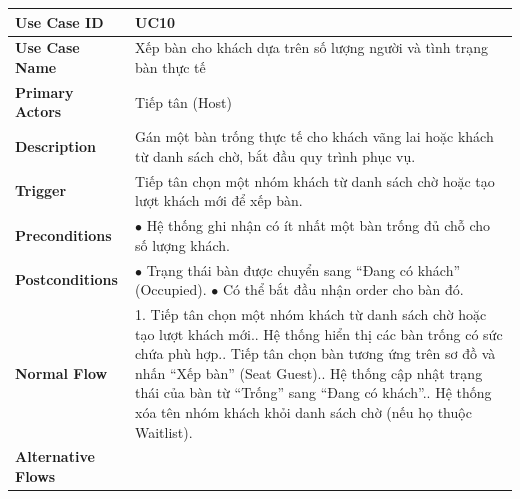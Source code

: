 \begin{longtable}{|p{3.5cm}|p{12.5cm}|}
\hline
\textbf{Use Case ID} & UC10 \\ \hline
\textbf{Use Case Name} & Xếp bàn cho khách dựa trên số lượng người và tình trạng bàn thực tế \\ \hline
\textbf{Primary Actors} & Tiếp tân (Host) \\ \hline
\textbf{Description} & Gán một bàn trống thực tế cho khách vãng lai hoặc khách từ danh sách chờ, bắt đầu quy trình phục vụ. \\ \hline
\textbf{Trigger} & Tiếp tân chọn một nhóm khách từ danh sách chờ hoặc tạo lượt khách mới để xếp bàn. \\ \hline
\textbf{Preconditions} & $\bullet$ Hệ thống ghi nhận có ít nhất một bàn trống đủ chỗ cho số lượng khách. \\ \hline
\textbf{Postconditions} &
$\bullet$ Trạng thái bàn được chuyển sang ``Đang có khách'' (Occupied).\newline
$\bullet$ Có thể bắt đầu nhận order cho bàn đó. \\ \hline
\textbf{Normal Flow} &
1. Tiếp tân chọn một nhóm khách từ danh sách chờ hoặc tạo lượt khách mới.\newline
2. Hệ thống hiển thị các bàn trống có sức chứa phù hợp.\newline
3. Tiếp tân chọn bàn tương ứng trên sơ đồ và nhấn ``Xếp bàn'' (Seat Guest).\newline
4. Hệ thống cập nhật trạng thái của bàn từ ``Trống'' sang ``Đang có khách''.\newline
5. Hệ thống xóa tên nhóm khách khỏi danh sách chờ (nếu họ thuộc Waitlist). \\ \hline
\textbf{Alternative Flows} &
\\ \hline
\end{longtable}


